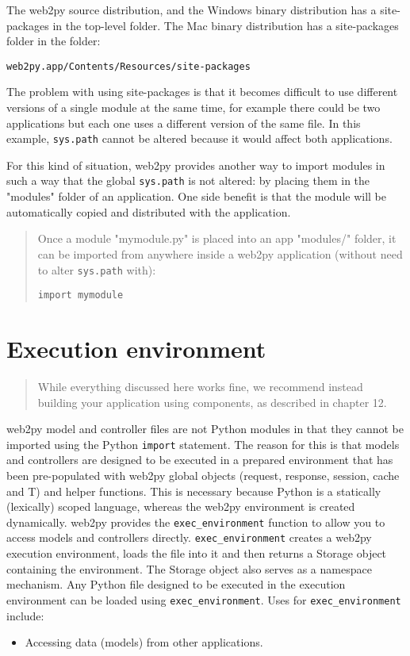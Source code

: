 \documentclass[justified,sixbynine,notoc]{tufte-book}
\def\ft{\small\tt}
\def\inxx#1{\index{#1}}
\begin{document}
\begin{fullwidth}
The web2py source distribution, and the Windows binary distribution has a site-packages in the top-level folder. The Mac binary distribution has a site-packages folder in the folder:

{\ft web2py.app/Contents/Resources/site-packages}

The problem with using site-packages is that it becomes difficult to use different versions of a single module at the same time, for example there could be two applications but each one uses a different version of the same file.  In this example, {\ft sys.path} cannot be altered because it would affect both applications.

For this kind of situation, web2py provides another way to import modules in such a way that the global {\ft sys.path} is not altered: by placing them in the "modules" folder of an application. One side benefit is that the module will be automatically copied and distributed with the application.

\begin{quote}Once a module "mymodule.py" is placed into an app "modules/" folder, it can be imported from anywhere inside a web2py application (without need to alter {\ft sys.path} with):
\begin{lstlisting}
import mymodule
\end{lstlisting}\end{quote}
\goodbreak\section{Execution environment}

\inxx{exec\_environment}

\begin{quote}While everything discussed here works fine, we recommend instead building your application using components, as described in chapter 12.\end{quote}
web2py model and controller files are not Python modules in that they cannot be imported using the Python {\ft import} statement. The reason for this is that models and controllers are designed to be executed in a prepared environment that has been pre-populated with web2py global objects (request, response, session, cache and T) and helper functions. This is necessary because Python is a statically (lexically) scoped language, whereas the web2py environment is created dynamically.
\noindent web2py provides the {\ft exec\_environment} function to allow you to access models and controllers directly. {\ft exec\_environment} creates a web2py execution environment, loads the file into it and then returns a Storage object containing the environment. The Storage object also serves as a namespace mechanism. Any Python file designed to be executed in the execution environment can be loaded using {\ft exec\_environment}. Uses for {\ft exec\_environment} include:
\begin{itemize}
\item Accessing data (models) from other applications.


\end{itemize}
\end{fullwidth}
\end{document}
